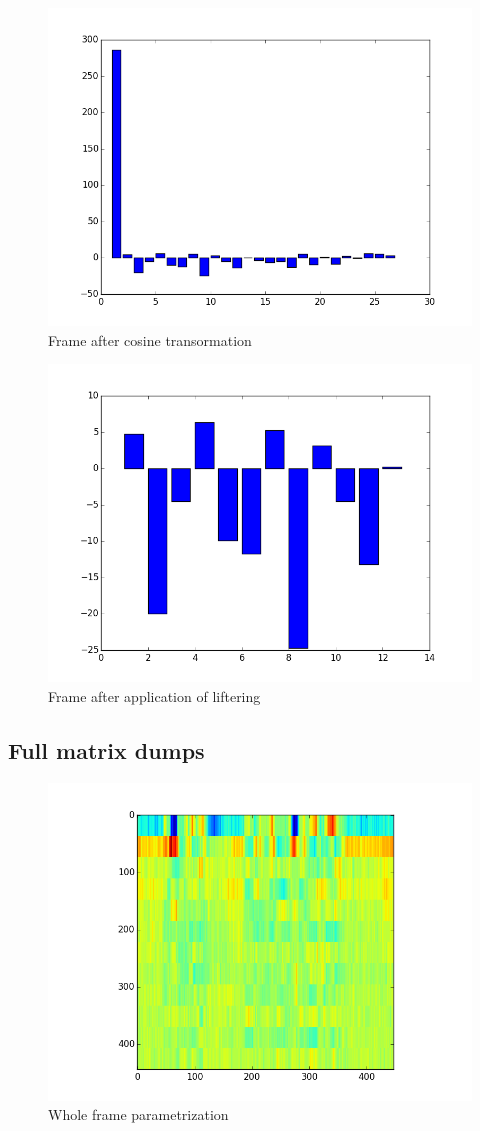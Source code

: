 \documentclass[magister]{dyplom}
\begin{document}
	\begin{figure}[!th]
		\centering
		\includegraphics[width=0.5\linewidth]{images/simulation/PAR_008_cosine_transformed_signal}
		\caption{Frame after cosine transormation}
		\label{fig:PAR_008_cosine_transformed_signal}
	\end{figure}

	\FloatBarrier
	\clearpage

	\begin{figure}[th!]
		\centering
		\includegraphics[width=0.5\linewidth]{images/simulation/PAR_009_liftered_signal}
		\caption{Frame after application of liftering}
		\label{fig:PAR_009_liftered_signal}
	\end{figure}

	
	\subsection{Full matrix dumps}
	\FloatBarrier
	
	\begin{figure}[th!]
		\centering
		\includegraphics[width=0.5\linewidth]{images/simulation/PAR_010_parametrized_raw}
		\caption{Whole frame parametrization}
		\label{fig:PAR_010_parametrized_raw}
	\end{figure}
\end{document}
